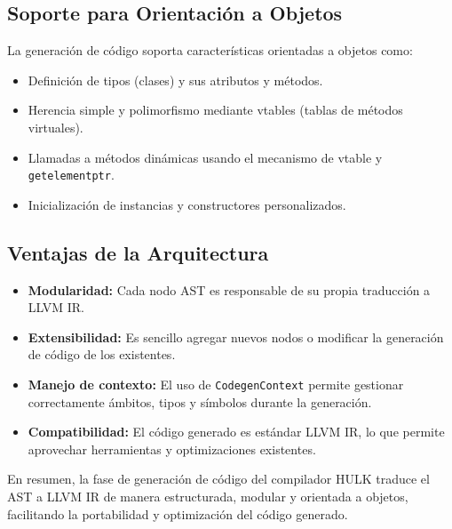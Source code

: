 \documentclass[a4paper, 12pt]{article}
\begin{document}
\subsection{Soporte para Orientación a Objetos}

La generación de código soporta características orientadas a objetos como:
\begin{itemize}
  \item Definición de tipos (clases) y sus atributos y métodos.
  \item Herencia simple y polimorfismo mediante vtables (tablas de métodos virtuales).
  \item Llamadas a métodos dinámicas usando el mecanismo de vtable y \texttt{getelementptr}.
  \item Inicialización de instancias y constructores personalizados.
\end{itemize}

\subsection{Ventajas de la Arquitectura}

\begin{itemize}
  \item \textbf{Modularidad:} Cada nodo AST es responsable de su propia traducción a LLVM IR.
  \item \textbf{Extensibilidad:} Es sencillo agregar nuevos nodos o modificar la generación de código de los existentes.
  \item \textbf{Manejo de contexto:} El uso de \texttt{CodegenContext} permite gestionar correctamente ámbitos, tipos y símbolos durante la generación.
  \item \textbf{Compatibilidad:} El código generado es estándar LLVM IR, lo que permite aprovechar herramientas y optimizaciones existentes.
\end{itemize}

En resumen, la fase de generación de código del compilador HULK traduce el AST a LLVM IR de manera estructurada, modular y orientada a objetos, facilitando la portabilidad y optimización del código generado.
\end{document}

